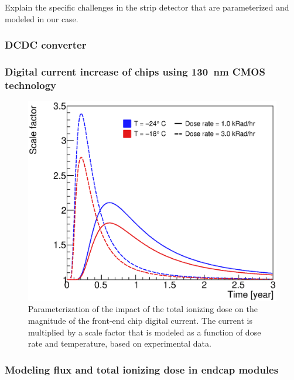 
Explain the specific challenges in the strip detector that are parameterized and modeled
in our case.

\subsubsection{DCDC converter}

\subsubsection{Digital current increase of chips using 130~nm CMOS technology}

\begin{figure}[ht]
\centering
\includegraphics[width=0.6\linewidth]{figures/AbcTidBumpVersionRatesAndTemps_Nominal.eps}
\caption{Parameterization of the impact of the total ionizing dose
on the magnitude of the front-end chip digital current. The current is multiplied by a scale factor
that is modeled as a function of dose rate and temperature, based on experimental data.}
\end{figure}

\subsubsection{Modeling flux and total ionizing dose in endcap modules}

